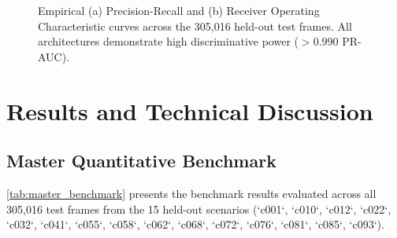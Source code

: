\documentclass[9pt]{ieeeconf}
\begin{document}
\begin{figure}[t]
\caption{Empirical (a) Precision-Recall and (b) Receiver Operating Characteristic curves across the 305,016 held-out test frames. All architectures demonstrate high discriminative power ($>0.990$ PR-AUC).}
\label{fig:curves}
\end{figure}

\section{Results and Technical Discussion}
\label{sec:results}

\subsection{Master Quantitative Benchmark}
\cref{tab:master_benchmark} presents the benchmark results evaluated across all 305,016 test frames from the 15 held-out scenarios (`c001`, `c010`, `c012`, `c022`, `c032`, `c041`, `c055`, `c058`, `c062`, `c068`, `c072`, `c076`, `c081`, `c085`, `c093`).
\end{document}
